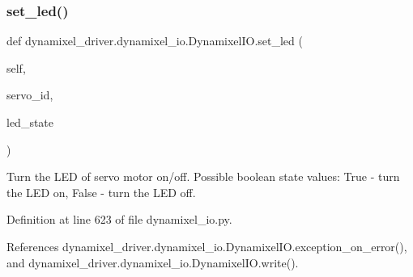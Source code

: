 \subsubsection{\texorpdfstring{set\+\_\+led()}{set\_led()}}
{\footnotesize\ttfamily def dynamixel\+\_\+driver.\+dynamixel\+\_\+io.\+Dynamixel\+I\+O.\+set\+\_\+led (\begin{DoxyParamCaption}\item[{}]{self,  }\item[{}]{servo\+\_\+id,  }\item[{}]{led\+\_\+state }\end{DoxyParamCaption})}

\begin{DoxyVerb}Turn the LED of servo motor on/off.
Possible boolean state values:
    True - turn the LED on,
    False - turn the LED off.
\end{DoxyVerb}
 

Definition at line 623 of file dynamixel\+\_\+io.\+py.



References dynamixel\+\_\+driver.\+dynamixel\+\_\+io.\+Dynamixel\+I\+O.\+exception\+\_\+on\+\_\+error(), and dynamixel\+\_\+driver.\+dynamixel\+\_\+io.\+Dynamixel\+I\+O.\+write().


